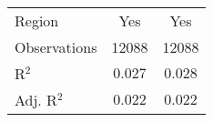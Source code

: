\begin{center}
\begin{tiny}
\begin{longtable}{l@{} c@{} c@{}}
\hline
Region                                                                      & Yes             & Yes              \\
Observations                                                                & 12088           & 12088            \\
R$^2$                                                                       & $0.027$         & $0.028$          \\
Adj. R$^2$                                                                  & $0.022$         & $0.022$          \\
\end{longtable}
\end{tiny}
\end{center}
